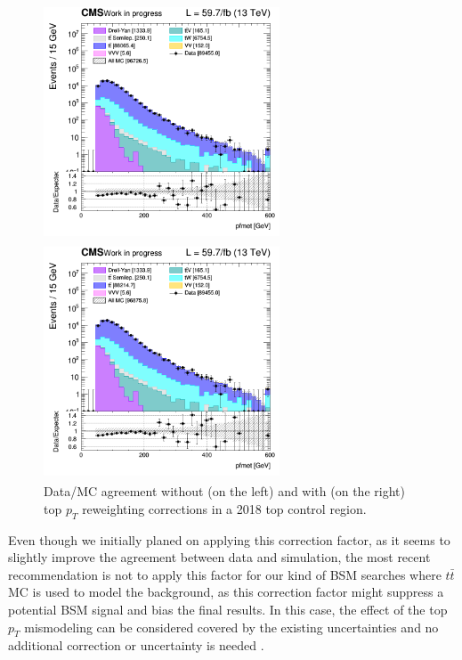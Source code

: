 \documentclass[a4paper, 10pt, openright]{report}
\begin{document}
\begin{figure}[htbp]
\begin{center}
\begin{minipage}[b]{.48\textwidth}
\includegraphics[width=7cm, height=7cm]{figs/log_cratio_ttbarCR_ll_METcorrected_pt_no_top_pt.png}
\end{minipage} \hfill
\begin{minipage}[b]{.48\textwidth}
\includegraphics[width=7cm, height=7cm]{figs/log_cratio_ttbarCR_ll_METcorrected_pt_with_top_pt.png}
\end{minipage} \hfill
\caption{Data/\ac{MC} agreement without (on the left) and with (on the right) top $p_T$ reweighting corrections in a 2018 top control region.}
\label{fig:Toppt}
\end{center}
\end{figure}

Even though we initially planed on applying this correction factor, as it seems to slightly improve the agreement between data and simulation, the most recent recommendation is not to apply this factor for our kind of \ac{BSM} searches where $t \bar t$ \ac{MC} is used to model the background, as this correction factor might suppress a potential \ac{BSM} signal and bias the final results. In this case, the effect of the top $p_T$ mismodeling can be considered covered by the existing uncertainties and no additional correction or uncertainty is needed \cite{topPtReweighting}.
\end{document}
